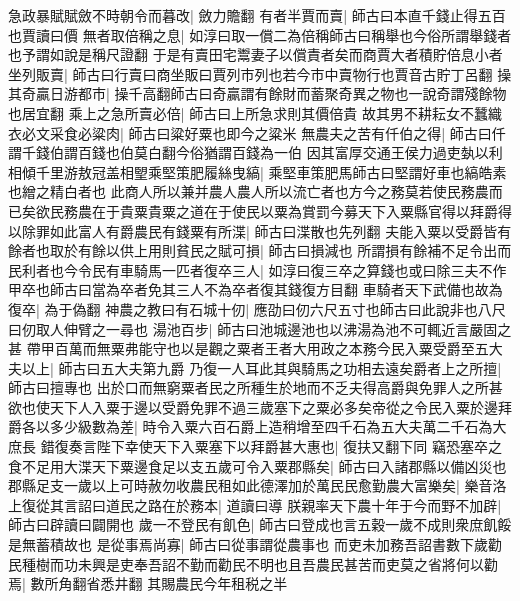急政暴賦賦斂不時朝令而暮改|{
	斂力贍翻}
有者半賈而賣|{
	師古曰本直千錢止得五百也賈讀曰價}
無者取倍稱之息|{
	如淳曰取一償二為倍稱師古曰稱舉也今俗所謂舉錢者也予謂如說是稱尺證翻}
于是有賣田宅鬻妻子以償責者矣而商賈大者積貯倍息小者坐列販賣|{
	師古曰行賣曰商坐販曰賈列市列也若今市中賣物行也賈音古貯丁呂翻}
操其奇贏日游都市|{
	操千高翻師古曰奇贏謂有餘財而蓄聚奇異之物也一說奇謂殘餘物也居宜翻}
乘上之急所賣必倍|{
	師古曰上所急求則其價倍貴}
故其男不耕耘女不蠶織衣必文采食必粱肉|{
	師古曰粱好粟也即今之粱米}
無農夫之苦有仟伯之得|{
	師古曰仟謂千錢伯謂百錢也伯莫白翻今俗猶謂百錢為一伯}
因其富厚交通王侯力過吏埶以利相傾千里游敖冠盖相朢乘堅策肥履絲曳縞|{
	乘堅車策肥馬師古曰堅謂好車也縞皓素也繒之精白者也}
此商人所以兼并農人農人所以流亡者也方今之務莫若使民務農而已矣欲民務農在于貴粟貴粟之道在于使民以粟為賞罰今募天下入粟縣官得以拜爵得以除罪如此富人有爵農民有錢粟有所渫|{
	師古曰渫散也先列翻}
夫能入粟以受爵皆有餘者也取於有餘以供上用則貧民之賦可損|{
	師古曰損減也}
所謂損有餘補不足令出而民利者也今令民有車騎馬一匹者復卒三人|{
	如淳曰復三卒之算錢也或曰除三夫不作甲卒也師古曰當為卒者免其三人不為卒者復其錢復方目翻}
車騎者天下武備也故為復卒|{
	為于偽翻}
神農之教曰有石城十仞|{
	應劭曰仞六尺五寸也師古曰此說非也八尺曰仞取人伸臂之一尋也}
湯池百步|{
	師古曰池城邊池也以沸湯為池不可輒近言嚴固之甚}
帶甲百萬而無粟弗能守也以是觀之粟者王者大用政之本務今民入粟受爵至五大夫以上|{
	師古曰五大夫第九爵}
乃復一人耳此其與騎馬之功相去遠矣爵者上之所擅|{
	師古曰擅專也}
出於口而無窮粟者民之所種生於地而不乏夫得高爵與免罪人之所甚欲也使天下人入粟于邊以受爵免罪不過三歲塞下之粟必多矣帝從之令民入粟於邊拜爵各以多少級數為差|{
	時令入粟六百石爵上造稍增至四千石為五大夫萬二千石為大庶長}
錯復奏言陛下幸使天下入粟塞下以拜爵甚大惠也|{
	復扶又翻下同}
竊恐塞卒之食不足用大渫天下粟邊食足以支五歲可令入粟郡縣矣|{
	師古曰入諸郡縣以備凶災也}
郡縣足支一歲以上可時赦勿收農民租如此德澤加於萬民民愈勤農大富樂矣|{
	樂音洛}
上復從其言詔曰道民之路在於務本|{
	道讀曰導}
朕親率天下農十年于今而野不加辟|{
	師古曰辟讀曰闢開也}
歲一不登民有飢色|{
	師古曰登成也言五穀一歲不成則衆庶飢餒是無蓄積故也}
是從事焉尚寡|{
	師古曰從事謂從農事也}
而吏未加務吾詔書數下歲勸民種樹而功未興是吏奉吾詔不勤而勸民不明也且吾農民甚苦而吏莫之省將何以勸焉|{
	數所角翻省悉井翻}
其賜農民今年租税之半

